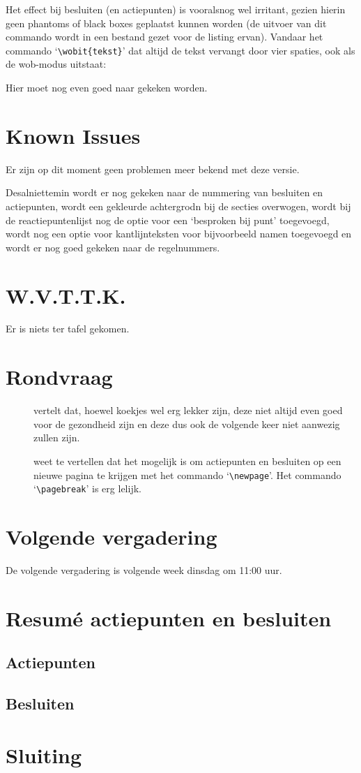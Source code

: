\documentclass[a4paper]{notulen}
\begin{document}
		Het effect bij besluiten (en actiepunten) is vooralsnog wel irritant, gezien hierin geen phantoms of black boxes geplaatst kunnen worden (de uitvoer van dit commando wordt in een bestand gezet voor de listing ervan). Vandaar het commando `\lstinline!\wobit{tekst}!' dat altijd de tekst vervangt door vier spaties, ook als de wob-modus uitstaat:
		
		
		Hier moet nog even goed naar gekeken worden.
		
	\section{Known Issues}
		Er zijn op dit moment geen problemen meer bekend met deze versie.
		
		Desalniettemin wordt er nog gekeken naar de nummering van besluiten en actiepunten, wordt een gekleurde achtergrodn bij de secties overwogen, wordt bij de reactiepuntenlijst nog de optie voor een `besproken bij punt' toegevoegd, wordt nog een optie voor kantlijnteksten voor bijvoorbeeld namen toegevoegd en wordt er nog goed gekeken naar de regelnummers.
		
	\section{W.V.T.T.K.}
		Er is niets ter tafel gekomen.
		
	\section{Rondvraag}
		\begin{description}
			\item[\ab] vertelt dat, hoewel koekjes wel erg lekker zijn, deze niet altijd even goed voor de gezondheid zijn en deze dus ook de volgende keer niet aanwezig zullen zijn.
			\item[\rb] weet te vertellen dat het mogelijk is om actiepunten en besluiten op een nieuwe pagina te krijgen met het commando `\lstinline!\newpage!'. Het commando `\lstinline!\pagebreak!' is erg lelijk.
		\end{description}
	
	\section{Volgende vergadering}
		De volgende vergadering is volgende week dinsdag om 11:00 uur.
	
	\section{Resum\'e actiepunten en besluiten}
		\subsection*{Actiepunten}
			\actiepunten
		\subsection*{Besluiten}
			\besluiten
	
	\section{Sluiting}
		\sluiting
	
\end{document}
